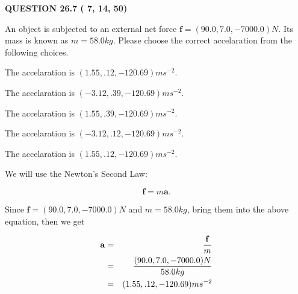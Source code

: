 \documentclass[12pt]{article}
\begin{document}
   
  
\vspace{0.2in}
  
{\textbf{\Large{QUESTION
26.7 
 (          7,         14,         50)
}}}
  
  
 
An object is subjected to an external net force $\mathbf{f}=
(90.0 , 7.0 , -7000.0) N$.
Its mass is known as $m= %
58.0 kg$.
Please choose the correct accelaration from the following choices.
 
 
  The accelaration is $  %
(
1.55,
.12,
-120.69)
ms^{-2} $.
 
 
  The accelaration is $  %
(
-3.12,
.39,
-120.69)
ms^{-2} $.
 
 
  The accelaration is $  %
(
1.55,
.39,
-120.69)
ms^{-2} $.
 
 
  The accelaration is $  %
(
-3.12,
.12,
-120.69)
ms^{-2} $.
 
 
\noindent{}
 
 
  The accelaration is $  %
(
1.55,
.12,
-120.69)
ms^{-2} $.
 
 
\noindent{}
 
 
 
 
 
\noindent{}
 
 

We will use the Newton's Second Law:
 
\[
\mathbf{f}=m\mathbf{a}.
\]
 
Since $\mathbf{f}= %
(90.0 , 7.0 , -7000.0) N$
and $m= %
58.0kg$, bring them into the above equation, then we get
 
\begin{eqnarray*}
\mathbf{a}&=&\frac{\mathbf{f}}m  \\
&=&\frac{ %
(90.0 , 7.0 , -7000.0) N}{ %
58.0kg}  \\
&=& %
(1.55 , .12 , -120.69) ms^{-2}
\end{eqnarray*}
 
 
 
\noindent{}
 
\end{document}
